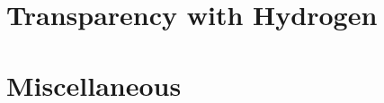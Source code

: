 \documentclass{msuthesis}
\begin{document}
\appendix %

\renewcommand{\appendixname}{\vspace*{3.25in}Appendix} %


\chapter{Transparency with Hydrogen}
\newpage %

\chapter{Miscellaneous} %
\newpage %

\end{document}
